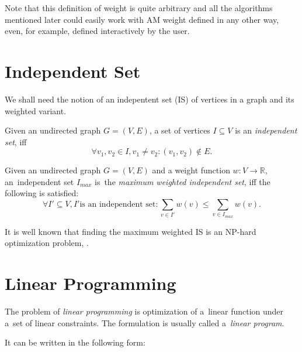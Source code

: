 Note that this definition of weight is quite arbitrary and all the algorithms mentioned later could easily work with AM weight defined in any other way, even, for example, defined interactively by the user.

\section{Independent Set}
\label{section-definitions-is}


We shall need the notion of an indepentent set (IS) of vertices in a graph and its weighted variant.

\begin{define}
Given an undirected graph $G = (V, E)$, a set of vertices $I \subseteq V$ is an \textit{independent set}, iff
\[\forall v_1, v_2 \in I, v_1 \neq v_2: (v_1, v_2) \notin E.\]
\end{define}

\begin{define}
Given an undirected graph $G = (V, E)$ and a weight function $w: V \rightarrow \mathbb{R}$, an~independent set $I_{max}$ is~the \textit{maximum weighted independent set}, iff the following is satisfied:
\[\forall I' \subseteq V, I' \text{is an independent set}: \sum_{v \in I'} w(v) \leqslant \sum_{v \in I_{max}} w(v).\]
\end{define}

It is well known that finding the maximum weighted IS is an NP-hard optimization problem, \cite{JM1986425}.

\section{Linear Programming}

The problem of \textit{linear programming} is optimization of a~linear function under a~set of linear constraints. The formulation is usually called a~\textit{linear program}. 

It can be written in the following form:

